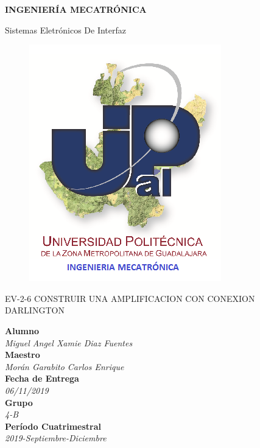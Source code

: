 \documentclass[11pt,a4paper]{article}
\author{Miguel Angel Xamie Diaz Fuentes}
\begin{document}
\begin{center}
\begin{LARGE}
\textbf{INGENIERÍA MECATRÓNICA}\\
\end{LARGE}
{\large Sistemas Eletrónicos De Interfaz}\\
\begin{figure}[hbtp]
\centering
\includegraphics[scale=0.80]{UPZMG_Mecatr_nica.png}
\end{figure} 
\begin{center}
\begin{LARGE}
EV-2-6 CONSTRUIR UNA AMPLIFICACION CON CONEXION DARLINGTON
\end{LARGE}
\end{center}

\begin{Large}
\textbf{Alumno}
\\\textit{Miguel Angel Xamie Diaz Fuentes}
\textbf{\\Maestro}
\\\textit{Morán Garabito Carlos Enrique}
\textbf{\\Fecha de Entrega}
\\\textit{06/11/2019}
\textbf{\\Grupo}
\\\textit{4-B}\\
\textbf{Período Cuatrimestral}\\
\textit{2019-Septiembre-Diciembre}
\\
\end{Large}

\end{center}
\end{document}
